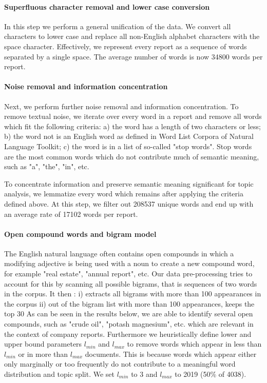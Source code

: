 \documentclass[12pt,journal,letterpaper,oneside,onecolumn]{IEEEtran}
\begin{document}
\paragraph{Superfluous character removal and lower case conversion}
In this step we perform a general unification of the data. We convert all characters to lower case and replace all non-English alphabet characters with the space character. Effectively, we represent every report as a sequence of words separated by a single space. The average number of words is now 34800 words per report.

\paragraph{Noise removal and information concentration}
Next, we perform further noise removal and information concentration. To remove textual noise, we iterate over every word in a report and remove all words which fit the following criteria: a) the word has a length of two characters or less; b) the word not is an English word as defined in Word List Corpora of Natural Language Toolkit\cite{nltk_book_2009}; c) the word is in a list of so-called "stop words".
Stop words are the most common words which do not contribute much of semantic meaning, such as "a", "the", "in", etc. 

To concentrate information and preserve semantic meaning significant for topic analysis, we lemmatize every word which remains after applying the criteria defined above. At this step, we filter out 208537 unique words and end up with an average rate of 17102 words per report.

\paragraph{Open compound words and bigram model}
The English natural language often contains open compounds in which a modifying adjective is being used with a noun to create a new compound word, for example "real estate", "annual report", etc.
Our data pre-processing tries to account for this by scanning all possible bigrams, that is sequences of two words in the corpus.
It then : \newline
i) extracts all bigrams with  more than 100 appearances in the corpus \newline
ii) out of the bigram list with more than 100 appearances, keeps the top 30
As can be seen in the results below, we are able to identify several open compounds, such as "crude oil", "potash magnesium", etc. which are relevant in the context of company reports.
\newline
Furthermore we heuristically define lower and upper bound parameters $l_{min}$ and $l_{max}$ to remove words which appear in less than $l_{min}$ or in more than $l_{max}$ documents. This is because words which appear either only marginally or too frequently do not contribute to a meaningful word distribution and topic split.
We set $l_{min}$ to 3 and $l_{max}$ to 2019 (50\% of 4038).
\end{document}
